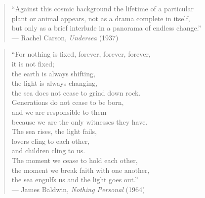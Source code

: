 \documentclass[
  12pt,
]{article}
\begin{document}
\begin{center}

\begin{minipage}{0.8\textwidth}
\begin{quote}

``Against this cosmic background the lifetime of a particular \\
  plant or animal appears, not as a drama complete in itself, \\
  but only as a brief interlude in a panorama of endless change.'' \\

— Rachel Carson, \textit{Undersea} (1937)
\end{quote}
\end{minipage}

\vspace*{\fill}

\begin{minipage}{0.8\textwidth}
\begin{quote}
``For nothing is fixed, forever, forever, forever, \\
  it is not fixed; \\
  the earth is always shifting, \\
  the light is always changing, \\
  the sea does not cease to grind down rock.\\
  Generations do not cease to be born,\\ 
  and we are responsible to them \\
  because we are the only witnesses they have. \\
 
  The sea rises, the light fails, \\
  lovers cling to each other, \\
  and children cling to us. \\
  The moment we cease to hold each other, \\
  the moment we break faith with one another, \\
  the sea engulfs us and the light goes out.'' \\


— James Baldwin, \textit{Nothing Personal} (1964)
\end{quote}
\end{minipage}

\vspace*{\fill}

\end{center}
\end{document}
